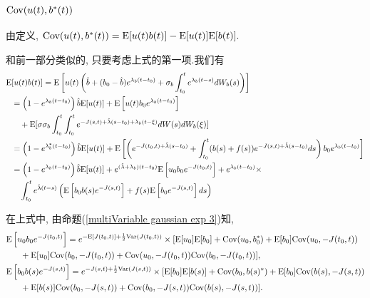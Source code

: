 \documentclass[notitlepage,cs4size,punct,oneside]{ctexrep}
\numberwithin{equation}{section}
\theoremstyle{mystyle}
\begin{document}
\subsubsection{$\text{Cov}(u(t), b^*(t))$}

由定义,
$
\text{Cov}(u(t), b^*(t)) = \text{E}[u(t)b(t)] - \text{E}[u(t)]\text{E}[b(t)].
$

和前一部分类似的, 只要考虑上式的第一项.我们有
\[
\begin{split}
\text{E}&[u(t)b(t)] = \text{E}\left[u(t)\left(\hat{b}+(b_0-\hat{b})e^{\lambda_b(t-t_0)}+\sigma_b\int_{t_0}^t e^{\lambda_b(t-s)}dW_b(s)\right)\right] \\
&= \left(1-e^{\lambda_b(t-t_0)}\right)\hat{b}\text{E}[u(t)] + \text{E}\left[u(t)b_0e^{\lambda_b(t-t_0)}\right] \\
&\quad + \text{E}[\sigma\sigma_b\int_{t_0}^t\int_{t_0}^te^{-J(s, t)+\hat\lambda(s-t_0)+\lambda_b(t-\xi)}dW(s)dW_b(\xi)] \\
&= \left(1-e^{\lambda_b^*(t-t_0)}\right)\hat{b}\text{E}[u(t)] + \text{E}\left[\left(e^{-J(t_0, t)+\hat\lambda(s-t_0)}+\int_{t_0}^t (b(s)+f(s))e^{-J(s, t)+\hat\lambda(s-t_0)}ds\right)b_0e^{\lambda_b(t-t_0)}\right] \\
&= \left(1-e^{\lambda_b(t-t_0)}\right)\hat{b}\text{E}[u(t)] + e^{(\hat\lambda+\lambda_b)(t-t_0)}\text{E}\left[u_0b_0e^{-J(t_0, t)}\right] + e^{\lambda_b(t-t_0)}\times \\
&\quad \int_{t_0}^t e^{\hat\lambda(t-s)}\left(\text{E}\left[b_0b(s)e^{-J(s, t)}\right]+f(s)\text{E}\left[b_0e^{-J(s, t)}\right]ds\right) \\
\end{split}
\]

在上式中, 由命题(\ref{multiVariable gaussian exp 3})知,
\[
\begin{split}
\text{E}&\left[u_0b_0e^{-J(t_0, t)}\right] = e^{-\text{E}[J(t_0, t)]+\frac{1}{2}\text{Var}(J(t_0, t))}\times[\text{E}[u_0]\text{E}[b_0]+\text{Cov}(u_0, b_0^*)+\text{E}[b_0]\text{Cov}(u_0, -J(t_0, t))\\
&\quad + \text{E}[u_0]\text{Cov}(b_0, -J(t_0, t))+\text{Cov}(u_0, -J(t_0, t))\text{Cov}(b_0, -J(t_0, t))], \\
\text{E}&\left[b_0b(s)e^{-J(s, t)}\right] = e^{-J(s, t)+\frac{1}{2}\text{Var}(J(s, t))}\times [\text{E}[b_0]\text{E}[b(s)]+\text{Cov}(b_0, b(s)^*)+\text{E}[b_0]\text{Cov}(b(s), -J(s, t)) \\
&\quad + \text{E}[b(s)]\text{Cov}(b_0, -J(s, t)) + \text{Cov}(b_0, -J(s, t))\text{Cov}(b(s), -J(s, t))].
\end{split}
\]

\end{document}
